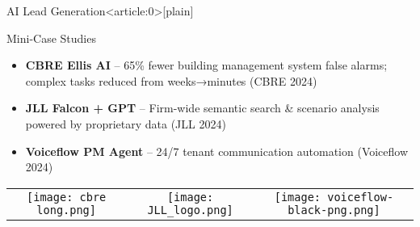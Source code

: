 \documentclass{beamer}
\begin{document}
{ %
    \begin{frame}{AI Lead Generation}<article:0>[plain]
     \end{frame}
}





\begin{frame}{Mini-Case Studies}
  \begin{itemize}
    \item \textbf{CBRE Ellis AI} – 65\% fewer building management system false alarms; complex tasks reduced from weeks→minutes {\tiny(CBRE 2024)}
    \item \textbf{JLL Falcon + GPT} – Firm-wide semantic search \& scenario analysis powered by proprietary data {\tiny(JLL 2024)}
    \item \textbf{Voiceflow PM Agent} – 24/7 tenant communication automation {\tiny(Voiceflow 2024)}
  \end{itemize}
  
  \vspace{0.5cm}
  \begin{center}
    \begin{tabular}{ccc}
      \texttt{[image: cbre long.png]} & 
      \texttt{[image: JLL\_logo.png]} & 
      \texttt{[image: voiceflow-black-png.png]} \\
    \end{tabular}
  \end{center}
\end{frame}
\end{document}
